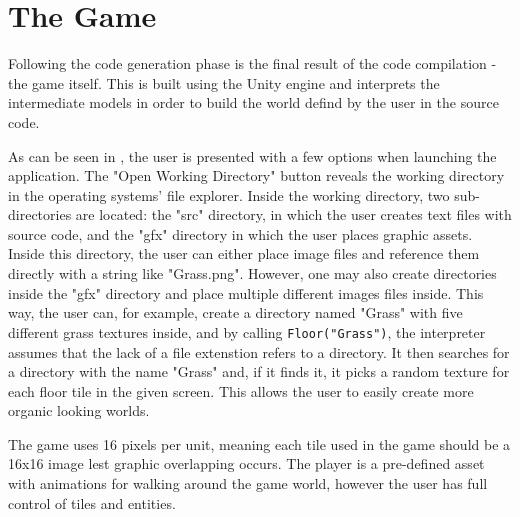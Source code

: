 \section{The Game}
Following the code generation phase is the final result of the code compilation - the game itself. 
This is built using the Unity engine and interprets the intermediate models in order to build the world defind by the user in the \dazel{} source code.


As can be seen in , the user is presented with a few options when launching the application. 
The "Open Working Directory" button reveals the working directory in the operating systems' file explorer.
Inside the working directory, two sub-directories are located: the "src" directory, in which the user creates text files with source code, and the "gfx" directory in which the user places graphic assets. Inside this directory, the user can either place image files and reference them directly with a string like "Grass.png". However, one may also create directories inside the "gfx" directory and place multiple different images files inside. This way, the user can, for example, create a directory named "Grass" with five different grass textures inside, and by calling \texttt{Floor("Grass")}, the interpreter assumes that the lack of a file extenstion refers to a directory. It then searches for a directory with the name "Grass" and, if it finds it, it picks a random texture for each floor tile in the given screen. This allows the user to easily create more organic looking worlds.

The game uses 16 pixels per unit, meaning each tile used in the game should be a 16x16 image lest graphic overlapping occurs. 
The player is a pre-defined asset with animations for walking around the game world, however the user has full control of tiles and entities.